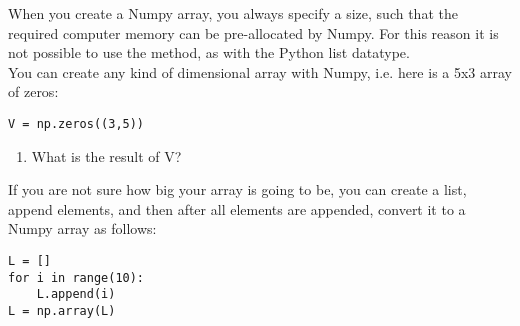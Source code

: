 \documentclass{article}
\begin{document}
When you create a Numpy array, you always specify a size, such that the required computer memory can be pre-allocated by Numpy.
For this reason it is not possible to use the  method, as with the Python list datatype.\\

You can create any kind of dimensional array with Numpy, i.e. here is a 5x3 array of zeros:

\begin{lstlisting}
V = np.zeros((3,5))
\end{lstlisting}

\begin{enumerate}[resume]
    \item What is the result of V?
\end{enumerate}

If you are not sure how big your array is going to be, you can create a list, append elements,
and then after all elements are appended, convert it to a Numpy array as follows:

\begin{lstlisting}
L = []
for i in range(10):
    L.append(i)
L = np.array(L)
\end{lstlisting}

%
%
%
\end{document}
